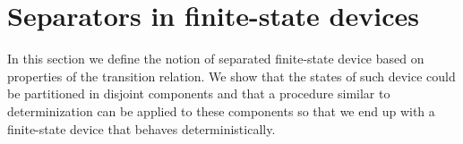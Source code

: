 \section{Separators in finite-state devices}

In this section we define the notion of separated finite-state device based on
properties of the transition relation. We show that the states of such device could
be partitioned in disjoint components and that a procedure similar to determinization
can be applied to these components so that we end up with a finite-state device
that behaves deterministically.



